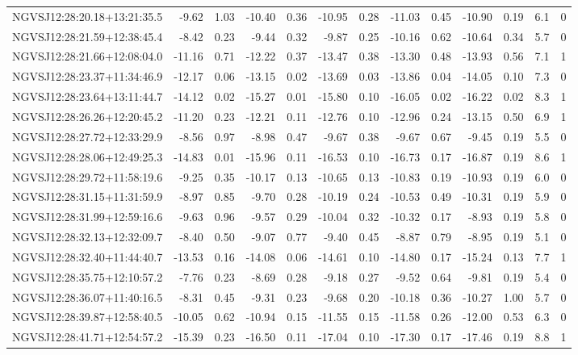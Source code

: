 \begin{tabular}{lrrrrrrrrrrcc}
NGVSJ12:28:20.18+13:21:35.5 & -9.62 & 1.03 & -10.40 & 0.36 & -10.95 & 0.28 & -11.03 & 0.45 & -10.90 & 0.19 & 6.1 & 0 \\
NGVSJ12:28:21.59+12:38:45.4 & -8.42 & 0.23 & -9.44 & 0.32 & -9.87 & 0.25 & -10.16 & 0.62 & -10.64 & 0.34 & 5.7 & 0 \\
NGVSJ12:28:21.66+12:08:04.0 & -11.16 & 0.71 & -12.22 & 0.37 & -13.47 & 0.38 & -13.30 & 0.48 & -13.93 & 0.56 & 7.1 & 1 \\
NGVSJ12:28:23.37+11:34:46.9 & -12.17 & 0.06 & -13.15 & 0.02 & -13.69 & 0.03 & -13.86 & 0.04 & -14.05 & 0.10 & 7.3 & 0 \\
NGVSJ12:28:23.64+13:11:44.7 & -14.12 & 0.02 & -15.27 & 0.01 & -15.80 & 0.10 & -16.05 & 0.02 & -16.22 & 0.02 & 8.3 & 1 \\
NGVSJ12:28:26.26+12:20:45.2 & -11.20 & 0.23 & -12.21 & 0.11 & -12.76 & 0.10 & -12.96 & 0.24 & -13.15 & 0.50 & 6.9 & 1 \\
NGVSJ12:28:27.72+12:33:29.9 & -8.56 & 0.97 & -8.98 & 0.47 & -9.67 & 0.38 & -9.67 & 0.67 & -9.45 & 0.19 & 5.5 & 0 \\
NGVSJ12:28:28.06+12:49:25.3 & -14.83 & 0.01 & -15.96 & 0.11 & -16.53 & 0.10 & -16.73 & 0.17 & -16.87 & 0.19 & 8.6 & 1 \\
NGVSJ12:28:29.72+11:58:19.6 & -9.25 & 0.35 & -10.17 & 0.13 & -10.65 & 0.13 & -10.83 & 0.19 & -10.93 & 0.19 & 6.0 & 0 \\
NGVSJ12:28:31.15+11:31:59.9 & -8.97 & 0.85 & -9.70 & 0.28 & -10.19 & 0.24 & -10.53 & 0.49 & -10.31 & 0.19 & 5.9 & 0 \\
NGVSJ12:28:31.99+12:59:16.6 & -9.63 & 0.96 & -9.57 & 0.29 & -10.04 & 0.32 & -10.32 & 0.17 & -8.93 & 0.19 & 5.8 & 0 \\
NGVSJ12:28:32.13+12:32:09.7 & -8.40 & 0.50 & -9.07 & 0.77 & -9.40 & 0.45 & -8.87 & 0.79 & -8.95 & 0.19 & 5.1 & 0 \\
NGVSJ12:28:32.40+11:44:40.7 & -13.53 & 0.16 & -14.08 & 0.06 & -14.61 & 0.10 & -14.80 & 0.17 & -15.24 & 0.13 & 7.7 & 1 \\
NGVSJ12:28:35.75+12:10:57.2 & -7.76 & 0.23 & -8.69 & 0.28 & -9.18 & 0.27 & -9.52 & 0.64 & -9.81 & 0.19 & 5.4 & 0 \\
NGVSJ12:28:36.07+11:40:16.5 & -8.31 & 0.45 & -9.31 & 0.23 & -9.68 & 0.20 & -10.18 & 0.36 & -10.27 & 1.00 & 5.7 & 0 \\
NGVSJ12:28:39.87+12:58:40.5 & -10.05 & 0.62 & -10.94 & 0.15 & -11.55 & 0.15 & -11.58 & 0.26 & -12.00 & 0.53 & 6.3 & 0 \\
NGVSJ12:28:41.71+12:54:57.2 & -15.39 & 0.23 & -16.50 & 0.11 & -17.04 & 0.10 & -17.30 & 0.17 & -17.46 & 0.19 & 8.8 & 1 \\

\end{tabular}
